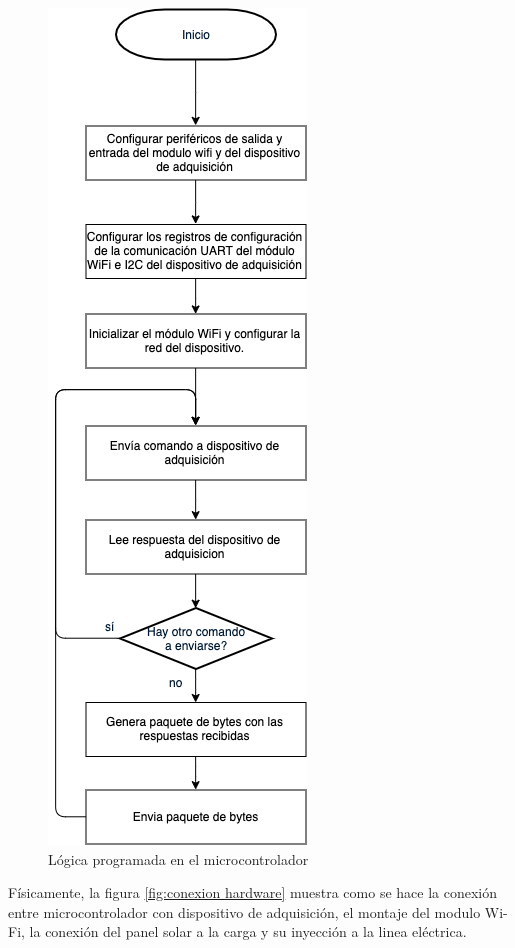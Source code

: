 \begin{figure}[H]
	\centering
	\includegraphics[scale=.5]{Capitulo5/images/logica_micro.png}
	\caption{Lógica programada en el microcontrolador}
	\label{fig:logica micro}
\end{figure} 

Físicamente, la figura \ref{fig:conexion hardware} muestra como se hace la conexión entre microcontrolador con dispositivo de adquisición, el montaje del modulo Wi-Fi, la conexión del panel solar a la carga y su inyección a la linea eléctrica.
    
